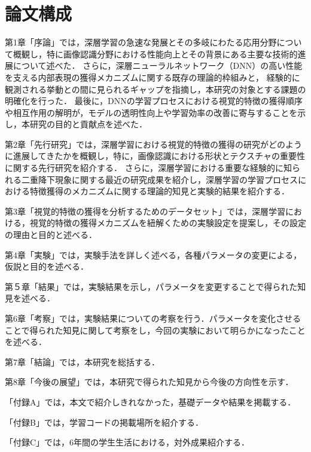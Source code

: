 \section{論文構成}
第1章「序論」では，深層学習の急速な発展とその多岐にわたる応用分野について概観し，特に画像認識分野における性能向上とその背景にある主要な技術的進展について述べた．
さらに，深層ニューラルネットワーク（DNN）の高い性能を支える内部表現の獲得メカニズムに関する既存の理論的枠組みと，
経験的に観測される挙動との間に見られるギャップを指摘し，本研究の対象とする課題の明確化を行った．
最後に，DNNの学習プロセスにおける視覚的特徴の獲得順序や相互作用の解明が，モデルの透明性向上や学習効率の改善に寄与することを示し，本研究の目的と貢献点を述べた．\par
第2章「先行研究」では，深層学習における視覚的特徴の獲得の研究がどのように進展してきたかを概観し，特に，画像認識における形状とテクスチャの重要性に関する先行研究を紹介する．
さらに，深層学習における重要な経験的に知られる二重降下現象に関する最近の研究成果を紹介し，深層学習の学習プロセスにおける特徴獲得のメカニズムに関する理論的知見と実験的結果を紹介する．\par
第3章「視覚的特徴の獲得を分析するためのデータセット」では，深層学習における，視覚的特徴の獲得メカニズムを紐解くための実験設定を提案し，その設定の理由と目的と述べる．\par
第4章「実験」では，実験手法を詳しく述べる，各種パラメータの変更による，仮説と目的を述べる．\par
第５章「結果」では，実験結果を示し，パラメータを変更することで得られた知見を述べる．\par
第6章「考察」では，実験結果についての考察を行う．パラメータを変化させることで得られた知見に関して考察をし，今回の実験において明らかになったことを述べる．\par
第7章「結論」では，本研究を総括する．\par
第8章「今後の展望」では，本研究で得られた知見から今後の方向性を示す．\par
「付録A」では，本文で紹介しきれなかった，基礎データや結果を掲載する．\par
「付録B」では，学習コードの掲載場所を紹介する．\par
「付録C」では，6年間の学生生活における，対外成果紹介する．\par

\newpage
